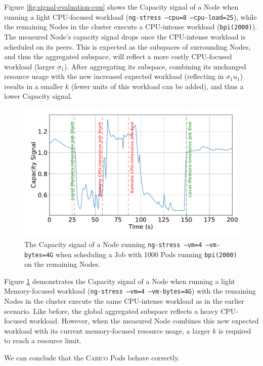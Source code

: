 Figure \ref{fig:signal-evaluation-cpu} shows the Capacity signal of a Node when
running a light CPU-focused workload (\texttt{ng-stress --cpu=8 --cpu-load=25}),
while the remaining Nodes in the cluster execute a CPU-intense workload
(\texttt{bpi(2000)}). The measured Node's capacity signal drops once the
CPU-intense workload is scheduled on its peers. This is expected as the
subspaces of surrounding Nodes, and thus the aggregated subspace, will reflect a
more costly CPU-focused workload (larger $\sigma_1$).  After aggregating its
subspace, combining its unchanged resource usage with the new increased
expected workload (reflecting in $\sigma_1 u_1$) results in a smaller $k$ (fewer
units of this workload can be added), and thus a lower Capacity signal.

\begin{figure}[ht!]
    \centering
    \includegraphics[width=\textwidth]{images/signal-with-memory.pdf}
    \caption{The Capacity signal of a Node running \texttt{ng-stress
    --vm=4 --vm-bytes=4G} when scheduling a Job with 1000 Pods
    running \texttt{bpi(2000)} on the remaining Nodes.}
    \label{fig:signal-evaluation-mem}
\end{figure}

Figure \ref{fig:signal-evaluation-mem} demonstrates the Capacity signal of a
Node when running a light Memory-focused workload (\texttt{ng-stress --vm=4
--vm-bytes=4G}) with the remaining Nodes in the cluster execute the same
CPU-intense workload as in the earlier scenario. Like before, the global
aggregated subspace reflects a heavy CPU-focused workload. However, when the
measured Node combines this new expected workload with its current
memory-focused resource usage, a larger $k$ is required to reach a resource
limit.

We can conclude that the \textsc{Carico} Pods behave correctly.


